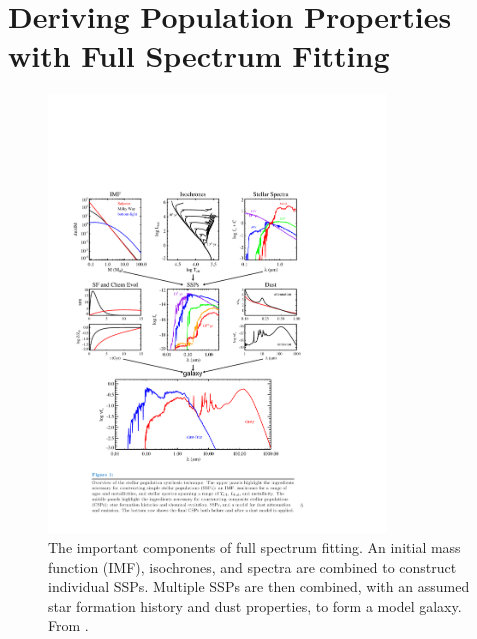 \section{Deriving Population Properties with Full Spectrum Fitting}
\label{intro:sec:SSP}
\begin{figure}
  \centering
  \includegraphics[width=0.8\textwidth]{Introduction/figs/conroy_13.pdf}
  \caption[Schematic of full spectrum
  fitting]{\fixspacing\label{intro:fig:conroy}The important components
    of full spectrum fitting. An initial mass function (IMF),
    isochrones, and spectra are combined to construct individual
    SSPs. Multiple SSPs are then combined, with an assumed star
    formation history and dust properties, to form a model
    galaxy. From \citet{Conroy13}.}
\end{figure}

